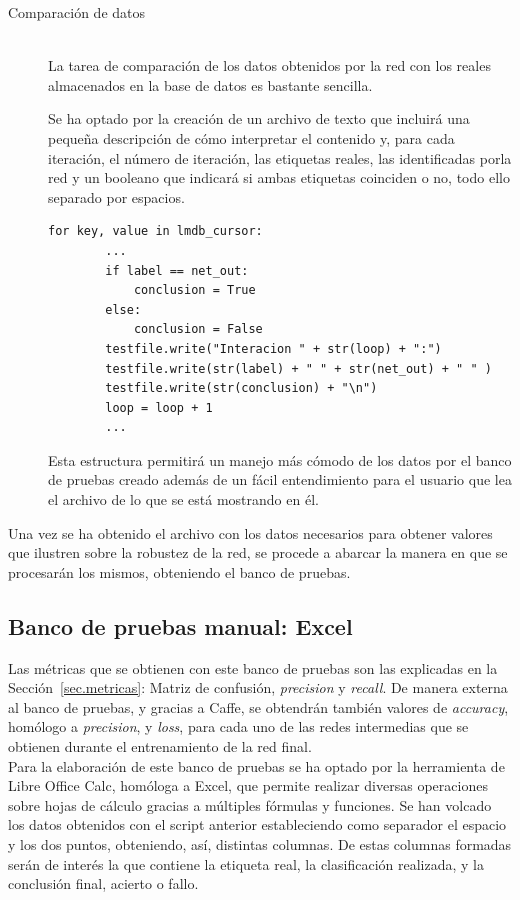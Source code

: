 \begin{description}
	\item[Comparación de datos] \hfill 
	\vspace{10pt}
	\\
	La tarea de comparación de los datos obtenidos por la red con los reales almacenados en la base de datos es bastante sencilla. \\
	\vspace{-10pt}
		
	Se ha optado por la creación de un archivo de texto que incluirá una pequeña descripción de cómo interpretar el contenido y, para cada iteración, el número de iteración, las etiquetas reales, las identificadas porla red y un booleano que indicará si ambas etiquetas coinciden o no, todo ello separado por espacios.
	\vspace{10pt}
	\begin{lstlisting}[frame=single]
	for key, value in lmdb_cursor:
		...
		if label == net_out:
			conclusion = True
		else:
			conclusion = False
		testfile.write("Interacion " + str(loop) + ":")
		testfile.write(str(label) + " " + str(net_out) + " " )
		testfile.write(str(conclusion) + "\n")
		loop = loop + 1
		...
	\end{lstlisting}
	Esta estructura permitirá un manejo más cómodo de los datos por el banco de pruebas creado además de un fácil entendimiento para el usuario que lea el archivo de lo que se está mostrando en él.\\
\end{description}
Una vez se ha obtenido el archivo con los datos necesarios para obtener valores que ilustren sobre la robustez de la red, se procede a abarcar la manera en que se procesarán los mismos, obteniendo el banco de pruebas.

\subsection{Banco de pruebas manual: Excel}
Las métricas que se obtienen con este banco de pruebas son las explicadas en la Sección~\ref{sec.metricas}: Matriz de confusión, \textit{precision} y \textit{recall}. De manera externa al banco de pruebas, y gracias a Caffe, se obtendrán también valores de \textit{accuracy}, homólogo a \textit{precision}, y \textit{loss}, para cada uno de las redes intermedias que se obtienen durante el entrenamiento de la red final.\\

Para la elaboración de este banco de pruebas se ha optado por la herramienta de Libre Office Calc, homóloga a Excel, que permite realizar diversas operaciones sobre hojas de cálculo gracias a múltiples fórmulas y funciones. Se han volcado los datos obtenidos con el script anterior estableciendo como separador el espacio y los dos puntos, obteniendo, así, distintas columnas. De estas columnas formadas serán de interés la que contiene la etiqueta real, la clasificación realizada, y la conclusión final, acierto o fallo.\\

